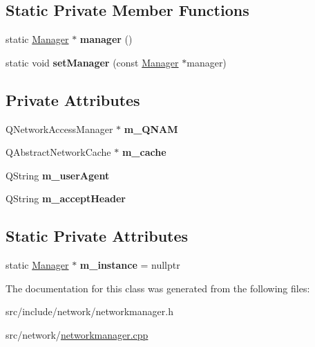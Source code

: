 \subsection*{Static Private Member Functions}
\begin{DoxyCompactItemize}
\item 
\mbox{\label{classNetwork_1_1Manager_a42c71474900c4d1e68740ae8d73db848}} 
static \mbox{\hyperlink{classNetwork_1_1Manager}{Manager}} $\ast$ {\bfseries manager} ()
\item 
\mbox{\label{classNetwork_1_1Manager_a1bc97c8b2dc5a4be751005d6a5dcf0a0}} 
static void {\bfseries set\+Manager} (const \mbox{\hyperlink{classNetwork_1_1Manager}{Manager}} $\ast$manager)
\end{DoxyCompactItemize}
\subsection*{Private Attributes}
\begin{DoxyCompactItemize}
\item 
\mbox{\label{classNetwork_1_1Manager_a6f69f8099c8706abebd1a4497e5038f8}} 
Q\+Network\+Access\+Manager $\ast$ {\bfseries m\+\_\+\+Q\+N\+AM}
\item 
\mbox{\label{classNetwork_1_1Manager_aa99fb56d9b2a75b5f5a63a191002f461}} 
Q\+Abstract\+Network\+Cache $\ast$ {\bfseries m\+\_\+cache}
\item 
\mbox{\label{classNetwork_1_1Manager_a59e8c58e1efd376525f400750ee87943}} 
Q\+String {\bfseries m\+\_\+user\+Agent}
\item 
\mbox{\label{classNetwork_1_1Manager_a04138b3a1b6b6d9a0c8816de74ab50a2}} 
Q\+String {\bfseries m\+\_\+accept\+Header}
\end{DoxyCompactItemize}
\subsection*{Static Private Attributes}
\begin{DoxyCompactItemize}
\item 
\mbox{\label{classNetwork_1_1Manager_a02ab401c85b17ffca2b9f3f69a4bae3b}} 
static \mbox{\hyperlink{classNetwork_1_1Manager}{Manager}} $\ast$ {\bfseries m\+\_\+instance} = nullptr
\end{DoxyCompactItemize}


The documentation for this class was generated from the following files\+:\begin{DoxyCompactItemize}
\item 
src/include/network/networkmanager.\+h\item 
src/network/\mbox{\hyperlink{networkmanager_8cpp}{networkmanager.\+cpp}}\end{DoxyCompactItemize}
